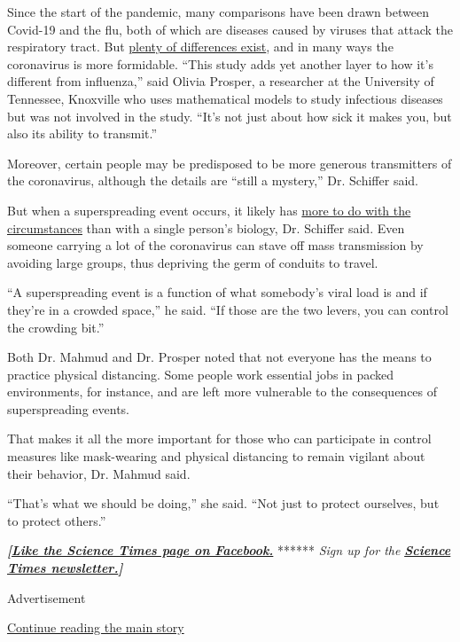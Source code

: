 Since the start of the pandemic, many comparisons have been drawn
between Covid-19 and the flu, both of which are diseases caused by
viruses that attack the respiratory tract. But
\href{https://www.cdc.gov/flu/symptoms/flu-vs-covid19.htm}{plenty of
differences exist}, and in many ways the coronavirus is more formidable.
``This study adds yet another layer to how it's different from
influenza,'' said Olivia Prosper, a researcher at the University of
Tennessee, Knoxville who uses mathematical models to study infectious
diseases but was not involved in the study. ``It's not just about how
sick it makes you, but also its ability to transmit.''

Moreover, certain people may be predisposed to be more generous
transmitters of the coronavirus, although the details are ``still a
mystery,'' Dr. Schiffer said.

But when a superspreading event occurs, it likely has
\href{https://www.nytimes.com/2020/06/30/science/how-coronavirus-spreads.html}{more
to do with the circumstances} than with a single person's biology, Dr.
Schiffer said. Even someone carrying a lot of the coronavirus can stave
off mass transmission by avoiding large groups, thus depriving the germ
of conduits to travel.

``A superspreading event is a function of what somebody's viral load is
and if they're in a crowded space,'' he said. ``If those are the two
levers, you can control the crowding bit.''

Both Dr. Mahmud and Dr. Prosper noted that not everyone has the means to
practice physical distancing. Some people work essential jobs in packed
environments, for instance, and are left more vulnerable to the
consequences of superspreading events.

That makes it all the more important for those who can participate in
control measures like mask-wearing and physical distancing to remain
vigilant about their behavior, Dr. Mahmud said.

``That's what we should be doing,'' she said. ``Not just to protect
ourselves, but to protect others.''

\textbf{\emph{{[}}\href{http://on.fb.me/1paTQ1h}{\emph{Like the Science
Times page on Facebook.}}} ****** \emph{\textbar{} Sign up for the}
\textbf{\href{http://nyti.ms/1MbHaRU}{\emph{Science Times
newsletter.}}\emph{{]}}}

Advertisement

\protect\hyperlink{after-bottom}{Continue reading the main story}

